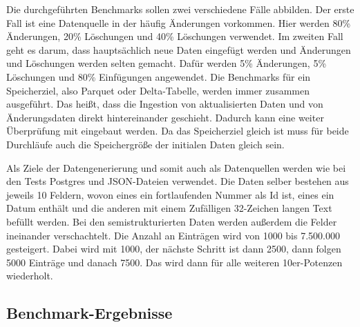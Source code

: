 Die durchgeführten Benchmarks sollen zwei verschiedene Fälle abbilden.
Der erste Fall ist eine Datenquelle in der häufig Änderungen vorkommen.
Hier werden 80\% Änderungen, 20\% Löschungen und 40\% Löschungen verwendet.
Im zweiten Fall geht es darum, dass hauptsächlich neue Daten eingefügt werden und Änderungen und Löschungen werden selten gemacht.
Dafür werden 5\% Änderungen, 5\% Löschungen und 80\% Einfügungen angewendet.
Die Benchmarks für ein Speicherziel, also Parquet oder Delta-Tabelle, werden immer zusammen ausgeführt.
Das heißt, dass die Ingestion von aktualisierten Daten und von Änderungsdaten direkt hintereinander geschieht.
Dadurch kann eine weiter Überprüfung mit eingebaut werden.
Da das Speicherziel gleich ist muss für beide Durchläufe auch die Speichergröße der initialen Daten gleich sein.

Als Ziele der Datengenerierung und somit auch als Datenquellen werden wie bei den Tests Postgres und JSON-Dateien verwendet.
Die Daten selber bestehen aus jeweils 10 Feldern, wovon eines ein fortlaufenden Nummer als Id ist, eines ein Datum enthält und die anderen mit einem Zufälligen 32-Zeichen langen Text befüllt werden.
Bei den semistrukturierten Daten werden außerdem die Felder ineinander verschachtelt.
Die Anzahl an Einträgen wird von 1000 bis 7.500.000 gesteigert.
Dabei wird mit 1000, der nächste Schritt ist dann 2500, dann folgen 5000 Einträge und danach 7500.
Das wird dann für alle weiteren 10er-Potenzen wiederholt.

\subsection{Benchmark-Ergebnisse}


